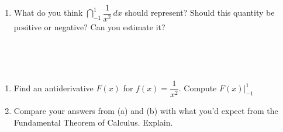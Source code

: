\documentclass[10pt]{article}
\begin{document}
\begin{minipage}[t]{0.6\textwidth}
    \exercise
    \begin{enumerate}
        \item[(a)] What do you think $\dint_{-1}^1 \dfrac1{x^2}\, dx$ should represent? Should this quantity be positive or negative? Can you estimate it?

        \vspace{1in}
    \end{enumerate}
\end{minipage}%
\hfill
%
\begin{minipage}[t]{0.375\textwidth}
\,\\[-0.4in]
    \begin{center}
    \end{center}
\end{minipage}\\

\begin{enumerate}
    \item[(b)] Find an antiderivative $F(x)$ for $f(x) = \dfrac1{x^2}$. Compute $F(x)\bigg\vert_{-1}^1$

    \vspace{1in}
    
    \item[(c)] Compare your answers from (a) and (b) with what you'd expect from the Fundamental Theorem of Calculus. Explain.

    \vspace{1in}
\end{enumerate}
\end{document}
